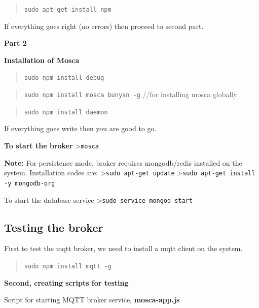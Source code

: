 \documentclass[16pt]{article}
\begin{document}
\begin{quote}
\texttt{sudo apt-get install npm}
\end{quote}

If everything goes right (no errors) then proceed to second part.

 \vspace{0.3cm}

\textbf{Part 2}

\textbf{Installation of Mosca}

\begin{quote}
\texttt{sudo npm install debug}
\end{quote}

\begin{quote}
\texttt{sudo npm install mosca bunyan -g} //for installing mosca
globally
\end{quote}

\begin{quote}
\texttt{sudo npm install daemon}
\end{quote}



If everything goes write then you are good to go.

 \vspace{0.3cm}

\textbf{To start the broker} \textgreater{}\texttt{mosca}

\textbf{Note:} For persistence mode, broker requires mongodb/redis
installed on the system. Installation codes are:
\textgreater{}\texttt{sudo apt-get update}
\textgreater{}\texttt{sudo apt-get install -y mongodb-org}

To start the database service
\textgreater{}\texttt{sudo service mongod start}


 \vspace{0.5cm}

\subsection{Testing the broker}

First to test the mqtt broker, we need to install a mqtt client on the
system.

\begin{quote}
\texttt{sudo npm install mqtt -g}
\end{quote}

\textbf{Second, creating scripts for testing}

Script for starting MQTT broker service, \textbf{mosca-app.js}
\end{document}

